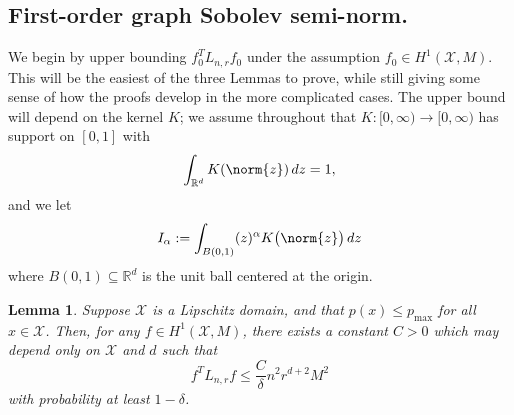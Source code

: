\documentclass{article}
\newcommand{\Reals}{\mathbb{R}}
\newcommand{\1}{\mathbf{1}}
\newcommand{\Lap}{L}
\newcommand{\Xset}{\mathcal{X}}
\theoremstyle{alden}
\theoremstyle{aldenthm}
\newtheorem{lemma}{Lemma}
\theoremstyle{definition}
\theoremstyle{remark}
\begin{document}
\subsection{First-order graph Sobolev semi-norm.}
We begin by upper bounding $f_0^T \Lap_{n,r} f_0$ under the assumption $f_0 \in H^1(\Xset,M)$. This will be the easiest of the three Lemmas to prove, while still giving some sense of how the proofs develop in the more complicated cases. The upper bound will depend on the kernel $K$; we assume throughout that $K:[0,\infty) \to [0,\infty)$ has support on $[0,1]$ with
\begin{equation*}
\int_{\Reals^d} K(\norm{z}) \,dz = 1,
\end{equation*}
and we let
\begin{equation*}
I_{\alpha} := \int_{B(0,1)} (z)^{\alpha} K\bigl(\norm{z}\bigr) \,dz
\end{equation*}
where $B(0,1) \subseteq \Reals^d$ is the unit ball centered at the origin.
\begin{lemma}
	\label{lem:first_order_graph_sobolev_seminorm}
	Suppose $\Xset$ is a Lipschitz domain, and that $p(x) \leq p_{\max}$ for all $x \in \Xset$. Then, for any $f \in H^1(\Xset,M)$, there exists a constant $C > 0$ which may depend only on $\Xset$ and $d$ such that
	\begin{equation}
	f^T \Lap_{n,r} f \leq \frac{C}{\delta} n^2 r^{d + 2} M^2
	\end{equation}
	with probability at least $1 - \delta$.
\end{lemma}
\end{document}
